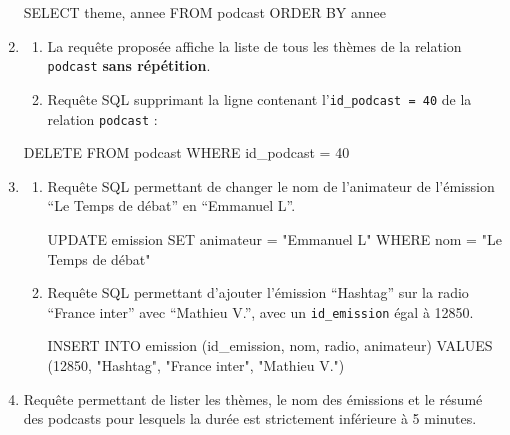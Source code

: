\documentclass[
  letterpaper,
  DIV=11,
  numbers=noendperiod]{scrartcl}
\newenvironment{Shaded}{\begin{snugshade}}{\end{snugshade}}
\newcommand{\DecValTok}[1]{\textcolor[rgb]{0.68,0.00,0.00}{#1}}
\newcommand{\KeywordTok}[1]{\textcolor[rgb]{0.00,0.23,0.31}{#1}}
\newcommand{\NormalTok}[1]{\textcolor[rgb]{0.00,0.23,0.31}{#1}}
\newcommand{\OperatorTok}[1]{\textcolor[rgb]{0.37,0.37,0.37}{#1}}
\newcommand{\OtherTok}[1]{\textcolor[rgb]{0.00,0.23,0.31}{#1}}
\begin{document}
\begin{enumerate}
\begin{Shaded}
\begin{Highlighting}[]
\KeywordTok{SELECT}\NormalTok{ theme, annee}
\KeywordTok{FROM}\NormalTok{ podcast}
\KeywordTok{ORDER} \KeywordTok{BY}\NormalTok{ annee}
\end{Highlighting}
\end{Shaded}
\item
  \begin{enumerate}
  \def\labelenumii{\alph{enumii}.}
  \item
    La requête proposée affiche la liste de tous les thèmes de la
    relation \texttt{podcast} \textbf{sans répétition}.
  \item
    Requête SQL supprimant la ligne contenant
    l'\texttt{id\_podcast\ =\ 40} de la relation \texttt{podcast} :
  \end{enumerate}

\begin{Shaded}
\begin{Highlighting}[]
\KeywordTok{DELETE} \KeywordTok{FROM}\NormalTok{ podcast}
\KeywordTok{WHERE}\NormalTok{ id\_podcast }\OperatorTok{=} \DecValTok{40}
\end{Highlighting}
\end{Shaded}
\item
  \begin{enumerate}
  \def\labelenumii{\alph{enumii}.}
  \item
    Requête SQL permettant de changer le nom de l'animateur de
    l'émission ``Le Temps de débat'' en ``Emmanuel L''.

\begin{Shaded}
\begin{Highlighting}[]
\KeywordTok{UPDATE}\NormalTok{ emission}
\KeywordTok{SET}\NormalTok{ animateur }\OperatorTok{=} \OtherTok{"Emmanuel L"}
\KeywordTok{WHERE}\NormalTok{ nom }\OperatorTok{=} \OtherTok{"Le Temps de débat"}
\end{Highlighting}
\end{Shaded}
  \item
    Requête SQL permettant d'ajouter l'émission ``Hashtag'' sur la radio
    ``France inter'' avec ``Mathieu V.'', avec un \texttt{id\_emission}
    égal à 12850.

\begin{Shaded}
\begin{Highlighting}[]
\KeywordTok{INSERT} \KeywordTok{INTO}\NormalTok{ emission (id\_emission, nom, radio, animateur)}
\KeywordTok{VALUES}\NormalTok{ (}\DecValTok{12850}\NormalTok{, }\OtherTok{"Hashtag"}\NormalTok{, }\OtherTok{"France inter"}\NormalTok{, }\OtherTok{"Mathieu V."}\NormalTok{)}
\end{Highlighting}
\end{Shaded}
  \end{enumerate}
\item
  Requête permettant de lister les thèmes, le nom des émissions et le
  résumé des podcasts pour lesquels la durée est strictement inférieure
  à 5 minutes.


\end{enumerate}
\end{document}
